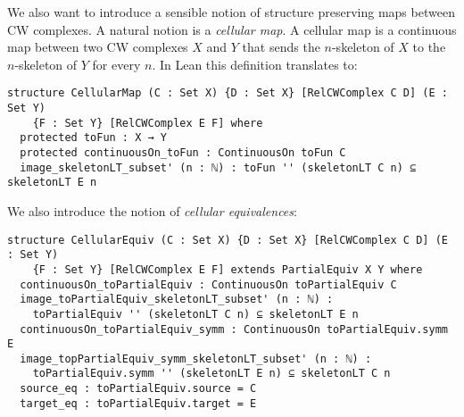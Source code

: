 We also want to introduce a sensible notion of structure preserving maps between CW complexes.
A natural notion is a \emph{cellular map}. 
A cellular map is a continuous map between two CW complexes $X$ and $Y$ that sends the $n$-skeleton of $X$ to the $n$-skeleton of $Y$ for every $n$.
In Lean this definition translates to: 

\begin{lstlisting}[frame=single]
structure CellularMap (C : Set X) {D : Set X} [RelCWComplex C D] (E : Set Y) 
    {F : Set Y} [RelCWComplex E F] where
  protected toFun : X → Y
  protected continuousOn_toFun : ContinuousOn toFun C
  image_skeletonLT_subset' (n : ℕ) : toFun '' (skeletonLT C n) ⊆ skeletonLT E n
\end{lstlisting}

We also introduce the notion of \emph{cellular equivalences}: 

\begin{lstlisting}[frame=single]
structure CellularEquiv (C : Set X) {D : Set X} [RelCWComplex C D] (E : Set Y) 
    {F : Set Y} [RelCWComplex E F] extends PartialEquiv X Y where
  continuousOn_toPartialEquiv : ContinuousOn toPartialEquiv C
  image_toPartialEquiv_skeletonLT_subset' (n : ℕ) :
    toPartialEquiv '' (skeletonLT C n) ⊆ skeletonLT E n
  continuousOn_toPartialEquiv_symm : ContinuousOn toPartialEquiv.symm E
  image_topPartialEquiv_symm_skeletonLT_subset' (n : ℕ) :
    toPartialEquiv.symm '' (skeletonLT E n) ⊆ skeletonLT C n
  source_eq : toPartialEquiv.source = C
  target_eq : toPartialEquiv.target = E
\end{lstlisting}

